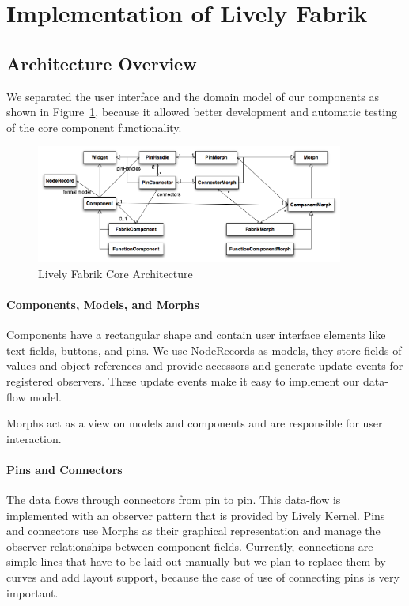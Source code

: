 \documentclass[pdftex, times, 10pt, twocolumn]{article}
\begin{document}
\section{Implementation of Lively Fabrik}


\subsection{Architecture Overview}
We separated the user interface and the domain model of our components as shown in Figure~\ref{fig:LivelyFabrikCore}, because it allowed better development and automatic testing of the core component functionality.  



\begin{figure}[]\centering
\includegraphics[width=0.900000\textwidth]{LivelyFabrikCore.png} 

\caption{Lively Fabrik Core Architecture }
\label{fig:LivelyFabrikCore}
\end{figure}


\paragraph{Components, Models, and Morphs}
Components have a rectangular shape and contain user interface elements like text fields, buttons, and pins.  We use NodeRecords as models, they store fields of values and object references and provide accessors and generate update events for registered observers. These update events make it easy to implement our data-flow model.  

Morphs act as a view on models and components and are responsible for user interaction.  



\paragraph{Pins and Connectors}
The data flows through connectors from pin to pin. This data-flow is implemented with an observer pattern that is provided by Lively Kernel. Pins and connectors use Morphs as their graphical representation and manage the observer relationships between component fields. Currently, connections are simple lines that have to be laid out manually but we plan to replace them by curves and add layout support, because the ease of use of connecting pins is very important. 
\end{document}
